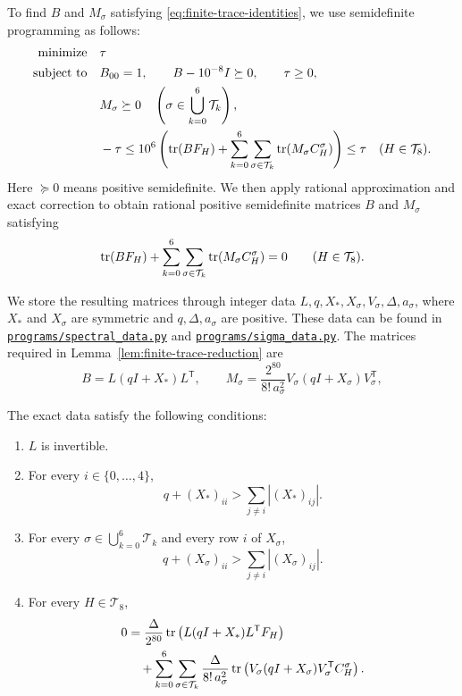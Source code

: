 To find $B$ and $M_\sigma$ satisfying
\eqref{eq:finite-trace-identities}, we use semidefinite programming as follows:
\begin{equation}\label{eq:matrix-search-sdp}
\begin{aligned}
\text{minimize}\quad &\tau\\
\text{subject to}\quad
&B_{00}=1,\qquad B-10^{-8}I\succeq0,\qquad\tau\geq0,\\
&M_\sigma\succeq0
\quad\left(\sigma\in\bigcup_{k=0}^6\mathcal T_k\right),\\
&-\tau\leq10^6\left(
\operatorname{tr}(BF_H)+\sum_{k=0}^6\sum_{\sigma\in\mathcal T_k}
\operatorname{tr}(M_\sigma C_H^\sigma)\right)\leq\tau
\quad(H\in\mathcal T_8).
\end{aligned}
\end{equation}
Here $\succeq0$ means positive semidefinite. We then apply rational approximation and exact correction to obtain rational positive semidefinite matrices $B$ and $M_\sigma$ satisfying
\[
\operatorname{tr}(BF_H)+\sum_{k=0}^6\sum_{\sigma\in\mathcal T_k}
\operatorname{tr}(M_\sigma C_H^\sigma)=0
\qquad(H\in\mathcal T_8).
\]

We store the resulting matrices through integer data
$L,q,X_*,X_\sigma,V_\sigma,\Delta,a_\sigma$, where $X_*$ and $X_\sigma$
are symmetric and $q,\Delta,a_\sigma$ are positive.
These data can be found in
\href{https://github.com/Diudiutse/triangle-free-signless-laplacian/blob/main/programs/spectral_data.py}{\texttt{programs/spectral\_data.py}}
and
\href{https://github.com/Diudiutse/triangle-free-signless-laplacian/blob/main/programs/sigma_data.py}{\texttt{programs/sigma\_data.py}}.
The matrices required in Lemma~\ref{lem:finite-trace-reduction} are
\begin{equation}\label{eq:stored-matrix-construction}
B=L(qI+X_*)L^{\mathsf T},\qquad
M_\sigma=\frac{2^{80}}{8!\,a_\sigma^2}
V_\sigma(qI+X_\sigma)V_\sigma^{\mathsf T},
\end{equation}

The exact data satisfy the following conditions:
\begin{enumerate}
\renewcommand{\labelenumi}{(\roman{enumi})}
\renewcommand{\theenumi}{\roman{enumi}}
\item\label{cond:integer-L-invertible}
$L$ is invertible.
\item\label{cond:integer-spectral-positive}
For every $i\in\{0,\ldots,4\}$,
\[
q+(X_*)_{ii}>\sum_{j\ne i}|(X_*)_{ij}|.
\]
\item\label{cond:integer-flag-positive}
For every $\sigma\in\bigcup_{k=0}^6\mathcal T_k$ and every row $i$
of $X_\sigma$,
\[
q+(X_\sigma)_{ii}>\sum_{j\ne i}|(X_\sigma)_{ij}|.
\]
\item\label{cond:integer-trace-identities}
For every $H\in\mathcal T_8$,
\begin{align}
0&=\frac{\Delta}{2^{80}}
\operatorname{tr}\left(L(qI+X_*)L^{\mathsf T}F_H\right)\notag\\
&\quad+\sum_{k=0}^6\sum_{\sigma\in\mathcal T_k}
\frac{\Delta}{8!\,a_\sigma^2}
\operatorname{tr}\left(V_\sigma(qI+X_\sigma)V_\sigma^{\mathsf T}
C_H^\sigma\right).
\label{eq:exact-integer-identities}
\end{align}
\end{enumerate}

